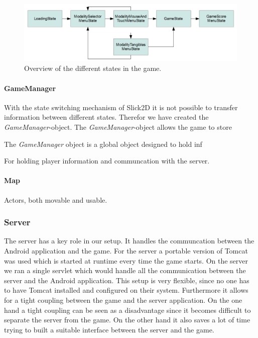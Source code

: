 \documentclass[a4paper,10pt]{article}
\begin{document}
\begin{figure}
\includegraphics[width=\columnwidth]{images/game-state-diagram.png}
\caption{Overview of the different states in the game.}
\label{fig:game-state-diagram}
\end{figure}

\paragraph{GameManager}
With the state switching mechanism of Slick2D it is not possible to transfer information between different states.
Therefor we have created the \emph{GameManager}-object.
The \emph{GameManager}-object allows the game to store 

The \emph{GameManager} object is a global object designed to hold inf

For holding player information and communcation with the server.


\paragraph{Map}
Actors, both movable and usable.


\subsubsection{Server}
The server has a key role in our setup.
It handles the communcation between the Android application and the game.
For the server a portable version of Tomcat was used which is started at runtime every time the game starts.
On the server we ran a single servlet which would handle all the communication between the server and the Android application.
This setup is very flexible, since no one has to have Tomcat installed and configured on their system.
Furthermore it allows for a tight coupling between the game and the server application.
On the one hand a tight coupling can be seen as a disadvantage since it becomes difficult to separate the server from the game.
On the other hand it also saves a lot of time trying to built a suitable interface between the server and the game.
\end{document}
